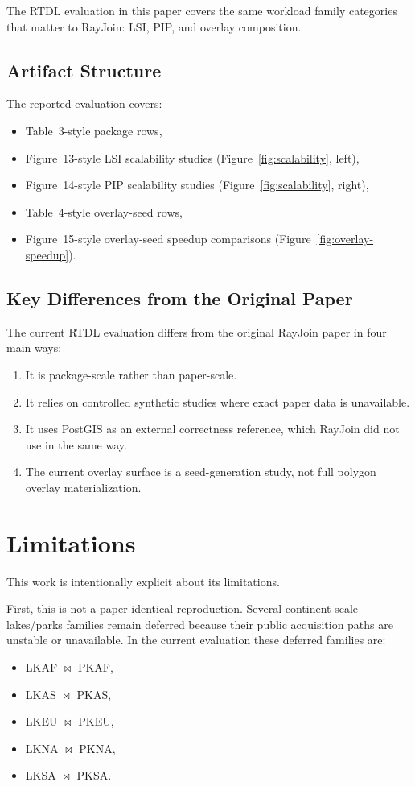 \documentclass[conference]{IEEEtran}
\begin{document}
The RTDL evaluation in this paper covers the same workload family categories
that matter to RayJoin: LSI, PIP, and overlay composition.

\subsection{Artifact Structure}

The reported evaluation covers:
\begin{itemize}
\item Table~3-style package rows,
\item Figure~13-style LSI scalability studies (Figure~\ref{fig:scalability}, left),
\item Figure~14-style PIP scalability studies (Figure~\ref{fig:scalability}, right),
\item Table~4-style overlay-seed rows,
\item Figure~15-style overlay-seed speedup comparisons (Figure~\ref{fig:overlay-speedup}).
\end{itemize}

\subsection{Key Differences from the Original Paper}

The current RTDL evaluation differs from the original RayJoin paper in four
main ways:
\begin{enumerate}
\item It is package-scale rather than paper-scale.
\item It relies on controlled synthetic studies where exact paper data is unavailable.
\item It uses PostGIS as an external correctness reference, which RayJoin did
not use in the same way.
\item The current overlay surface is a seed-generation study, not full
polygon overlay materialization.
\end{enumerate}

\section{Limitations}

This work is intentionally explicit about its limitations.

First, this is not a paper-identical reproduction. Several continent-scale
lakes/parks families remain deferred because their public acquisition paths are
unstable or unavailable. In the current evaluation these deferred families
are:
\begin{itemize}
\item LKAF $\bowtie$ PKAF,
\item LKAS $\bowtie$ PKAS,
\item LKEU $\bowtie$ PKEU,
\item LKNA $\bowtie$ PKNA,
\item LKSA $\bowtie$ PKSA.
\end{itemize}
\end{document}
